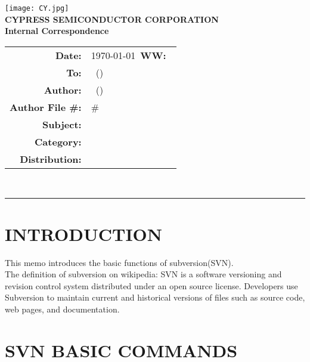 \documentclass{article}
\renewcommand{\maketitle}
{
	\begin{center}
	\texttt{[image: CY.jpg]}\\
	\vspace{5 mm}
	\large
	{
	\textbf{CYPRESS SEMICONDUCTOR CORPORATION}\\
	\textbf{Internal Correspondence}\\
	}
	\vspace{1 mm}
	\hspace{0.5 in}
	\begin{tabular}{rl}
	\bf Date: & \today\ \hspace{2 in}\textbf{WW:\ }\WorkWeek\\
	\bf To: & \BossName\ (\BossInitials)\\
	\bf Author: & \Author\ (\AuthorInitials)\\
	\bf Author File \#: & \AuthorInitials\#\MemoNumber\\
	\bf Subject: & \Subject\\
	\bf Category: & \Category\\
	\bf Distribution: & \Distribution\\
	\end{tabular}
	\vspace{3 mm}\\
	\hrule
	\end{center}
	
	\thispagestyle{firstpage}
	\pagestyle{normalpage}
}
\begin{document}
\maketitle


\section{INTRODUCTION}
This memo introduces the basic functions of subversion(SVN). \\
The definition of subversion on wikipedia:
SVN is a software versioning and revision control system distributed under an open source license. Developers use Subversion to maintain current and historical versions of files such as source code, web pages, and documentation.

\section{SVN BASIC COMMANDS}
\end{document}
